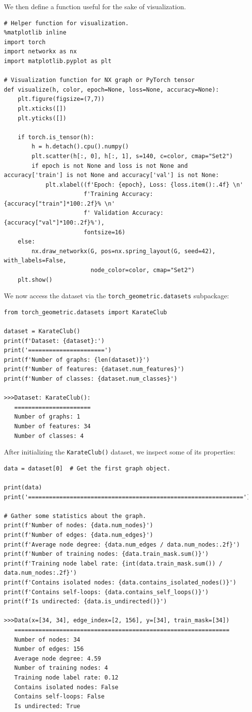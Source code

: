 \documentclass[12pt,a4paper]{report}
\theoremstyle{definition}
\begin{document}
We then define a function useful for the sake of visualization.
\begin{lstlisting}
# Helper function for visualization.
%matplotlib inline
import torch
import networkx as nx
import matplotlib.pyplot as plt

# Visualization function for NX graph or PyTorch tensor
def visualize(h, color, epoch=None, loss=None, accuracy=None):
    plt.figure(figsize=(7,7))
    plt.xticks([])
    plt.yticks([])

    if torch.is_tensor(h):
        h = h.detach().cpu().numpy()
        plt.scatter(h[:, 0], h[:, 1], s=140, c=color, cmap="Set2")
        if epoch is not None and loss is not None and accuracy['train'] is not None and accuracy['val'] is not None:
            plt.xlabel((f'Epoch: {epoch}, Loss: {loss.item():.4f} \n'
                       f'Training Accuracy: {accuracy["train"]*100:.2f}% \n'
                       f' Validation Accuracy: {accuracy["val"]*100:.2f}%'),
                       fontsize=16)
    else:
        nx.draw_networkx(G, pos=nx.spring_layout(G, seed=42), with_labels=False,
                         node_color=color, cmap="Set2")
    plt.show()
\end{lstlisting}

We now access the dataset via the \lstinline{torch_geometric.datasets} subpackage:
\begin{lstlisting}
from torch_geometric.datasets import KarateClub

dataset = KarateClub()
print(f'Dataset: {dataset}:')
print('======================')
print(f'Number of graphs: {len(dataset)}')
print(f'Number of features: {dataset.num_features}')
print(f'Number of classes: {dataset.num_classes}')

>>>Dataset: KarateClub():
   ======================
   Number of graphs: 1
   Number of features: 34
   Number of classes: 4
\end{lstlisting}

After initializing the \lstinline{KarateClub()} dataset, we inspect some of its properties:
\begin{lstlisting}
data = dataset[0]  # Get the first graph object.

print(data)
print('==============================================================')

# Gather some statistics about the graph.
print(f'Number of nodes: {data.num_nodes}')
print(f'Number of edges: {data.num_edges}')
print(f'Average node degree: {data.num_edges / data.num_nodes:.2f}')
print(f'Number of training nodes: {data.train_mask.sum()}')
print(f'Training node label rate: {int(data.train_mask.sum()) / data.num_nodes:.2f}')
print(f'Contains isolated nodes: {data.contains_isolated_nodes()}')
print(f'Contains self-loops: {data.contains_self_loops()}')
print(f'Is undirected: {data.is_undirected()}')

>>>Data(x=[34, 34], edge_index=[2, 156], y=[34], train_mask=[34])
   ==============================================================
   Number of nodes: 34
   Number of edges: 156
   Average node degree: 4.59
   Number of training nodes: 4
   Training node label rate: 0.12
   Contains isolated nodes: False
   Contains self-loops: False
   Is undirected: True
\end{lstlisting}
\end{document}
